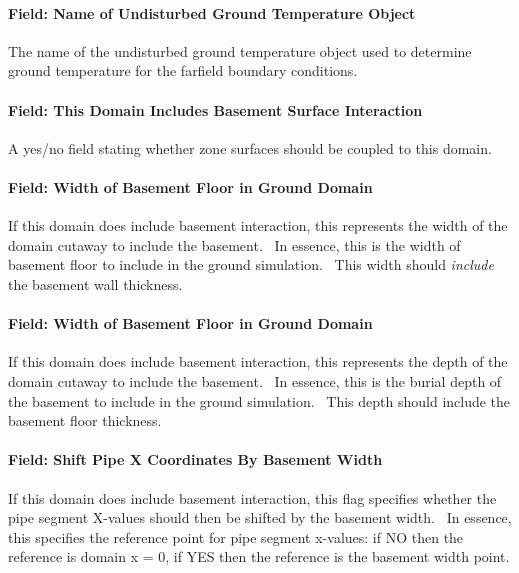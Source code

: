 \paragraph{Field: Name of Undisturbed Ground Temperature Object}\label{field-name-of-undisturbed-ground-temperature-object-1-001}

The name of the undisturbed ground temperature object used to determine ground temperature for the farfield boundary conditions.

\paragraph{Field: This Domain Includes Basement Surface Interaction}\label{field-this-domain-includes-basement-surface-interaction}

A yes/no field stating whether zone surfaces should be coupled to this domain.

\paragraph{Field: Width of Basement Floor in Ground Domain}\label{field-width-of-basement-floor-in-ground-domain}

If this domain does include basement interaction, this represents the width of the domain cutaway to include the basement.~ In essence, this is the width of basement floor to include in the ground simulation.~ This width should \emph{include} the basement wall thickness.

\paragraph{Field: Width of Basement Floor in Ground Domain}\label{field-width-of-basement-floor-in-ground-domain-1}

If this domain does include basement interaction, this represents the depth of the domain cutaway to include the basement.~ In essence, this is the burial depth of the basement to include in the ground simulation.~ This depth should include the basement floor thickness.

\paragraph{Field: Shift Pipe X Coordinates By Basement Width}\label{field-shift-pipe-x-coordinates-by-basement-width}

If this domain does include basement interaction, this flag specifies whether the pipe segment X-values should then be shifted by the basement width.~ In essence, this specifies the reference point for pipe segment x-values: if NO then the reference is domain x = 0, if YES then the reference is the basement width point.


